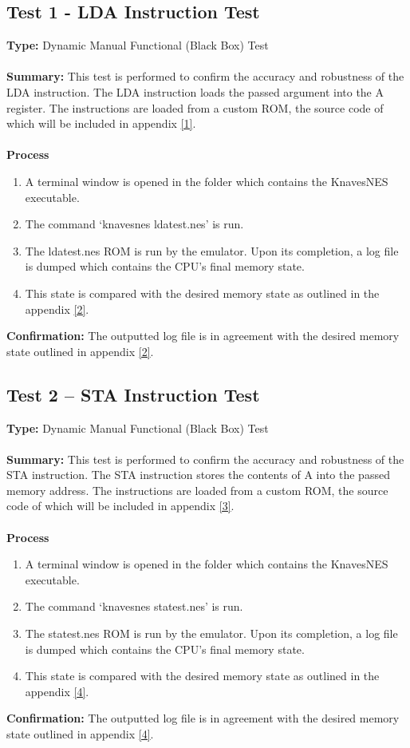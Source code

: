 \documentclass[12pt]{article}
\begin{document}
	\subsection{Test 1 - LDA Instruction Test}
		\textbf{Type: } Dynamic Manual Functional (Black Box) Test\\\\
		\textbf{Summary: } This test is performed to confirm the accuracy and robustness of the LDA instruction. The LDA instruction loads the passed argument into the A register. The instructions are loaded from a custom ROM, the source code of which will be included in appendix \hyperlink{appendix}{[1]}.\\\\
		\textbf{Process}
			\begin{enumerate}
				\item A terminal window is opened in the folder which contains the KnavesNES executable.
				\item The command ‘knavesnes ldatest.nes’ is run.
				\item The ldatest.nes ROM is run by the emulator. Upon its completion, a log file is dumped which contains the CPU’s final memory state.
				\item This state is compared with the desired memory state as outlined in the appendix \hyperlink{appendix}{[2]}.
			\end{enumerate}
		\textbf{Confirmation: } The outputted log file is in agreement with the desired memory state outlined in appendix \hyperlink{appendix}{[2]}.
	\subsection{Test 2 – STA Instruction Test}
		\textbf{Type: } Dynamic Manual Functional (Black Box) Test\\\\
		\textbf{Summary: } This test is performed to confirm the accuracy and robustness of the STA instruction. The STA instruction stores the contents of A into the passed memory address. The instructions are loaded from a custom ROM, the source code of which will be included in appendix \hyperlink{appendix}{[3]}.\\\\
		\textbf{Process}
			\begin{enumerate}
				\item A terminal window is opened in the folder which contains the KnavesNES executable.
				\item The command ‘knavesnes statest.nes’ is run.
				\item The statest.nes ROM is run by the emulator. Upon its completion, a log file is dumped which contains the CPU’s final memory state.
				\item This state is compared with the desired memory state as outlined in the appendix \hyperlink{appendix}{[4]}.
			\end{enumerate}
		\textbf{Confirmation: } The outputted log file is in agreement with the desired memory state outlined in appendix \hyperlink{appendix}{[4]}.
\end{document}
